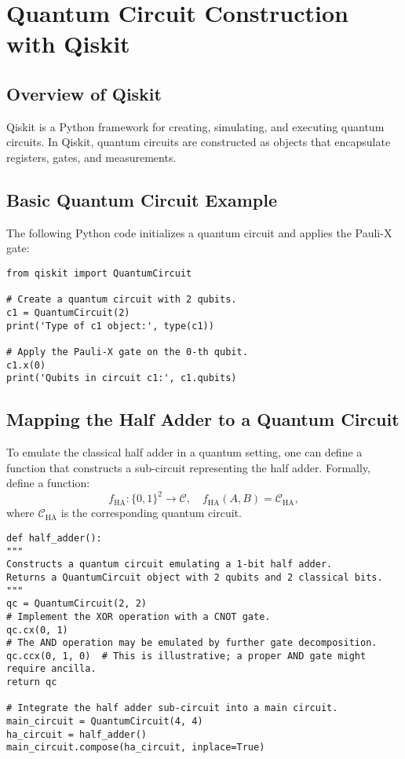 \documentclass[12pt]{book}
\theoremstyle{remark}
\begin{document}
	\chapter{Quantum Circuit Construction with Qiskit}
	\section{Overview of Qiskit}
	Qiskit is a Python framework for creating, simulating, and executing quantum circuits. In Qiskit, quantum circuits are constructed as objects that encapsulate registers, gates, and measurements.
	
	\section{Basic Quantum Circuit Example}
	The following Python code initializes a quantum circuit and applies the Pauli-X gate:
	
\begin{lstlisting}[style=pythonstyle, caption={Quantum Circuit Initialization in Qiskit}]
from qiskit import QuantumCircuit

# Create a quantum circuit with 2 qubits.
c1 = QuantumCircuit(2)
print('Type of c1 object:', type(c1))

# Apply the Pauli-X gate on the 0-th qubit.
c1.x(0)
print('Qubits in circuit c1:', c1.qubits)
\end{lstlisting}
	
	\section{Mapping the Half Adder to a Quantum Circuit}
	To emulate the classical half adder in a quantum setting, one can define a function that constructs a sub-circuit representing the half adder. Formally, define a function:
	\[
	f_{\text{HA}}: \{0,1\}^2 \to \mathcal{C},\quad f_{\text{HA}}(A,B) = \mathcal{C}_{\text{HA}},
	\]
	where \(\mathcal{C}_{\text{HA}}\) is the corresponding quantum circuit.
	
\begin{lstlisting}[style=pythonstyle, caption={Definition of half\_adder() Function}]
def half_adder():
"""
Constructs a quantum circuit emulating a 1-bit half adder.
Returns a QuantumCircuit object with 2 qubits and 2 classical bits.
"""
qc = QuantumCircuit(2, 2)
# Implement the XOR operation with a CNOT gate.
qc.cx(0, 1)
# The AND operation may be emulated by further gate decomposition.
qc.ccx(0, 1, 0)  # This is illustrative; a proper AND gate might require ancilla.
return qc

# Integrate the half adder sub-circuit into a main circuit.
main_circuit = QuantumCircuit(4, 4)
ha_circuit = half_adder()
main_circuit.compose(ha_circuit, inplace=True)
\end{lstlisting}
	
\end{document}
